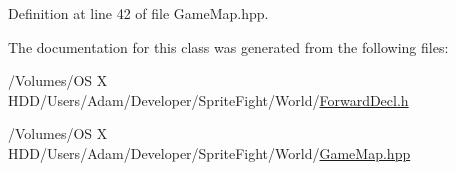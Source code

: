 Definition at line 42 of file Game\-Map.\-hpp.



The documentation for this class was generated from the following files\-:\begin{DoxyCompactItemize}
\item 
/\-Volumes/\-O\-S X H\-D\-D/\-Users/\-Adam/\-Developer/\-Sprite\-Fight/\-World/\hyperlink{_forward_decl_8h}{Forward\-Decl.\-h}\item 
/\-Volumes/\-O\-S X H\-D\-D/\-Users/\-Adam/\-Developer/\-Sprite\-Fight/\-World/\hyperlink{_game_map_8hpp}{Game\-Map.\-hpp}\end{DoxyCompactItemize}
